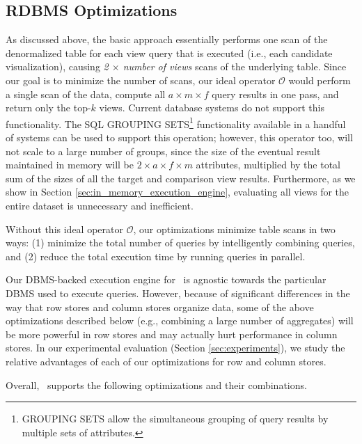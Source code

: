 \subsection{RDBMS Optimizations} 
\label{sec:dbms_optimizations}
As discussed above, the basic approach essentially 
performs one scan of the denormalized table for each
view query that is executed (i.e., each candidate visualization), 
causing {\it 2 $\times$ number of views} scans of the
underlying table. Since our goal is to minimize the number of scans, our ideal
operator $\mathcal{O}$ would perform a single scan of the data, compute all
$a \times m \times f$ query results in one pass, 
and return only the top-$k$ views.
Current database systems do not support this functionality. 
The SQL GROUPING SETS\footnote{GROUPING SETS allow the simultaneous
grouping of query results by multiple sets of attributes.} functionality
available in a handful of systems can be used to support this operation;
however, this operator too, will not scale to a large number of groups,
since the size of the eventual result maintained in memory will be
$2 \times a \times f \times m$ attributes, 
multiplied by the total sum of the sizes of all the target
and comparison view results. 
Furthermore, as we show in Section \ref{sec:in_memory_execution_engine}, evaluating all
views for the entire dataset is unnecessary and inefficient.

Without this ideal operator $\mathcal{O}$,
our optimizations minimize table scans in two ways: (1) minimize the total number of
queries by intelligently combining queries, and (2) reduce the total
execution time by running queries in parallel. 

Our DBMS-backed execution engine for \VizRecDB\ is agnostic towards the
particular DBMS used to execute queries. 
However, because of significant differences in the way that row stores and
column stores organize data, some of the above optimizations described below (e.g.,  combining a
large number of aggregates) will be more powerful in row stores and may actually
hurt performance in column stores. In our experimental evaluation (Section
\ref{sec:experiments}), we study the relative advantages of each of our
optimizations for row and column stores.



Overall, \VizRecDB\ supports the following
optimizations and their combinations.

